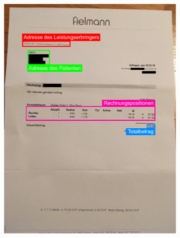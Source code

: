 \begin{figure}[H]
  \captionsetup{width=.9\linewidth}
  \caption{Zwei Beispiele von Rechnungen mit annotierten Regions of Interest}
  \label{fig:roi-example}
  \centering
  \begin{subfigure}[t]{0.5\linewidth}
    \captionsetup{width=.9\linewidth}
    \centering
    \includegraphics[scale=1]{graphics/roi-example-cp.pdf}
    \vspace{6pt}
    \vspace{2ex}
  \end{subfigure}%
  \begin{subfigure}[t]{0.5\linewidth}
    \captionsetup{width=.9\linewidth}
    \centering

\end{subfigure}
\end{figure}
